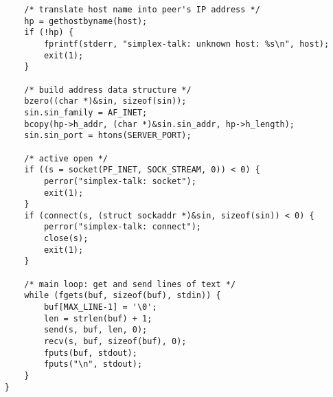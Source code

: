 \documentclass[a4paper,10pt]{article}
\begin{document}
\begin{itemize}
\begin{lstlisting}
    	/* translate host name into peer's IP address */
    	hp = gethostbyname(host);
    	if (!hp) {
    		fprintf(stderr, "simplex-talk: unknown host: %s\n", host);
    		exit(1);
    	}
    
    	/* build address data structure */
    	bzero((char *)&sin, sizeof(sin));
    	sin.sin_family = AF_INET;
    	bcopy(hp->h_addr, (char *)&sin.sin_addr, hp->h_length);
    	sin.sin_port = htons(SERVER_PORT);
    
    	/* active open */
    	if ((s = socket(PF_INET, SOCK_STREAM, 0)) < 0) {
    		perror("simplex-talk: socket");
    		exit(1);
    	}
    	if (connect(s, (struct sockaddr *)&sin, sizeof(sin)) < 0) {
    		perror("simplex-talk: connect");
    		close(s);
    		exit(1);
    	}
    
    	/* main loop: get and send lines of text */
    	while (fgets(buf, sizeof(buf), stdin)) {
    		buf[MAX_LINE-1] = '\0';
    		len = strlen(buf) + 1;
    		send(s, buf, len, 0);
            recv(s, buf, sizeof(buf), 0);
            fputs(buf, stdout);
            fputs("\n", stdout);
    	}
    }
            \end{lstlisting}
    \end{itemize}
\end{document}
